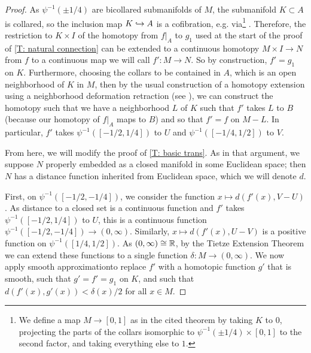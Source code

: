 \begin{proof}
	As $\psi^{-1}(\pm 1/4)$ are bicollared submanifolds of $M$, the submanifold $K \subset A$ is collared, so the inclusion map $K \hookrightarrow A$ is a cofibration, e.g. via\footnote{We define a map $M \to [0,1]$ as in the cited theorem by taking $K$ to $0$, projecting the parts of the collars isomorphic to $\psi^{-1}(\pm 1/4) \times [0,1]$ to the second factor, and taking everything else to $1$.} \cite[Theorem VII.1.5]{Bred97}.
	Therefore, the restriction to $K \times I$ of the homotopy from $f|_A$ to $g_1$ used at the start of the proof of \cref{T: natural connection} can be extended to a continuous homotopy $M \times I \to N$ from $f$ to a continuous map we will call $f' \colon M \to N$.
	So by construction, $f' = g_1$ on $K$.
	Furthermore, choosing the collars to be contained in $A$, which is an open neighborhood of $K$ in $M$, then by the usual construction of a homotopy extension using a neighborhood deformation retraction (see \cite[Section VII.1]{Bred97}), we can construct the homotopy such that we have a neighborhood $L$ of $K$ such that $f'$ takes $L$ to $B$ (because our homotopy of $f|_A$ maps to $B$) and so that $f' = f$ on $M - L$.
	In particular, $f'$ takes $\psi^{-1}([-1/2,1/4])$ to $U$ and $\psi^{-1}([-1/4,1/2])$ to $V$.

	From here, we will modify the proof of \cref{T: basic trans}.
	As in that argument, we suppose $N$ properly embedded as a closed manifold in some Euclidean space; then $N$ has a distance function inherited from Euclidean space, which we will denote $d$.

	First, on $\psi^{-1}([-1/2,-1/4])$, we consider the function $x \mapsto d(f'(x), V - U)$.
	As distance to a closed set is a continuous function and $f'$ takes $\psi^{-1}([-1/2,1/4])$ to $U$, this is a continuous function $\psi^{-1}([-1/2,-1/4]) \to (0,\infty)$.
	Similarly, $x \mapsto d(f'(x), U - V)$ is a positive function on $\psi^{-1}([1/4, 1/2])$.
	As $(0,\infty) \cong \mathbb{R}$, by the Tietze Extension Theorem we can extend these functions to a single function $\delta \colon M \to (0, \infty)$.
	We now apply smooth approximation\footnotemark to replace $f'$ with a homotopic function $g'$ that is smooth, such that $g' = f' = g_1$ on $K$, and such that $d(f'(x),g'(x))<\delta(x)/2$ for all $x \in M$.


\end{proof}
